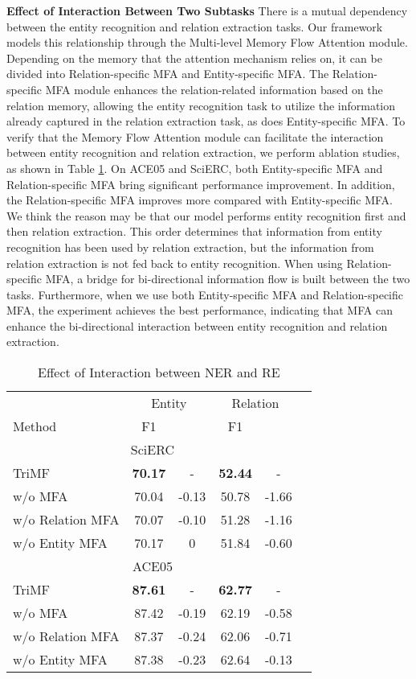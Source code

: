 \documentclass[sigconf]{acmart}
\begin{document}
\noindent\textbf{Effect of Interaction Between Two Subtasks}
There is a mutual dependency between the entity recognition and relation extraction tasks. Our framework models this relationship through the Multi-level Memory Flow Attention module. Depending on the memory that the attention mechanism relies on, it can be divided into Relation-specific MFA and Entity-specific MFA. The Relation-specific MFA module enhances the relation-related information based on the relation memory, allowing the entity recognition task to utilize the information already captured in the relation extraction task, as does Entity-specific MFA. To verify that the Memory Flow Attention module can facilitate the interaction between entity recognition and relation extraction, we perform ablation studies, as shown in Table \ref{tab:as_interaction}. On ACE05 and SciERC, both Entity-specific MFA and Relation-specific MFA bring significant performance improvement. In addition, the Relation-specific MFA improves more compared with Entity-specific MFA. We think the reason may be that our model performs entity recognition first and then relation extraction. This order determines that information from entity recognition has been used by relation extraction, but the information from relation extraction is not fed back to entity recognition. When using Relation-specific MFA, a bridge for bi-directional information flow is built between the two tasks. Furthermore, when we use both Entity-specific MFA and Relation-specific MFA, the experiment achieves the best performance, indicating that MFA can enhance the bi-directional interaction between entity recognition and relation extraction.


\begin{table}
\small
  \begin{tabular}{@{}lccccc@{}}
  \toprule
 	& \multicolumn{2}{c}{Entity} & \multicolumn{2}{c}{Relation} \\ 
 	\cmidrule(lr){2-3} \cmidrule(lr){4-5}
 	Method & F1 &  & F1 &  \\ \midrule
 	\multicolumn{5}{c}{SciERC} \\ \midrule
  	TriMF  &  \textbf{70.17} & - &  \textbf{52.44} & -\\ 
 	\quad w/o MFA & 70.04 & -0.13 & 50.78 & -1.66\\
 	\quad w/o Relation MFA  & 70.07 & -0.10 & 51.28 & -1.16 \\
 	\quad w/o Entity MFA  & 70.17 & 0 & 51.84 & -0.60 \\ \midrule

  	\multicolumn{5}{c}{ACE05} \\ \midrule
   	TriMF  &  \textbf{87.61} & - &  \textbf{62.77} & -\\
  	\quad w/o MFA & 87.42 & -0.19 & 62.19 & -0.58\\
 	\quad w/o Relation MFA  & 87.37 & -0.24 & 62.06 & -0.71\\
 	\quad w/o Entity MFA  & 87.38  & -0.23 & 62.64 & -0.13 \\

   \bottomrule
 \end{tabular}
 \caption{Effect of Interaction between NER and RE}
  \label{tab:as_interaction}
\end{table}
\end{document}
